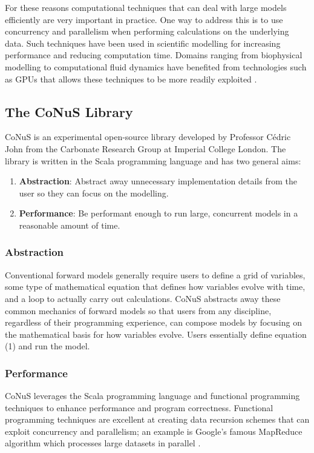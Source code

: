 \documentclass[12pt]{article}
\begin{document}
For these reasons computational techniques that can deal with large models efficiently are very important in practice. One way to address this is to use concurrency and parallelism when performing calculations on the underlying data. Such techniques have been used in scientific modelling for increasing performance and reducing computation time. Domains ranging from biophysical modelling to computational fluid dynamics have benefited from technologies such as GPUs that allows these techniques to be more readily exploited \autocite{4490127}.

\subsection{The CoNuS Library}
CoNuS is an experimental open-source library developed by Professor Cédric John from the Carbonate Research Group at Imperial College London. The library is written in the Scala programming language and has two general aims:

\begin{enumerate}
\item \textbf{Abstraction}: Abstract away unnecessary implementation details from the user so they can focus on the modelling.
\item \textbf{Performance}: Be performant enough to run large, concurrent models in a reasonable amount of time.
\end{enumerate}

\subsubsection{Abstraction}
Conventional forward models generally require users to define a grid of variables, some type of mathematical equation that defines how variables evolve with time, and a loop to actually carry out calculations. CoNuS abstracts away these common mechanics of forward models so that users from any discipline, regardless of their programming experience, can compose models by focusing on the mathematical basis for how variables evolve. Users essentially define equation (1) and run the model.

\subsubsection{Performance}
CoNuS leverages the Scala programming language and functional programming techniques to enhance performance and program correctness. Functional programming techniques are excellent at creating data recursion schemes that can exploit concurrency and parallelism; an example is Google's famous MapReduce algorithm which processes large datasets in parallel \autocite{LAMMEL20081}. 
\end{document}
